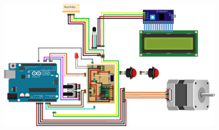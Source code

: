 \begin{figure}[h]
	\centering
	\includegraphics[width=0.7\linewidth]{../images/circuito}
	\caption{}
	\label{fig:diagramaHardware}
\end{figure}


